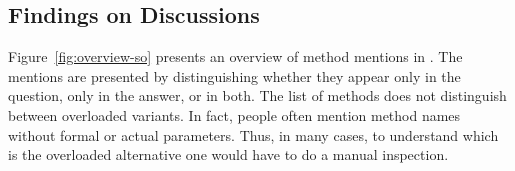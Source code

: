 




\subsection{Findings on \stackoverflow Discussions}

Figure~\ref{fig:overview-so} presents an overview of \smu{} method mentions in \stackoverflow{}. The mentions are presented by distinguishing whether they appear only in the question, only in the answer, or in both.
The list of methods does not distinguish between overloaded variants. In fact, people often mention method names without formal or actual parameters. Thus, in many cases, to understand which is the overloaded alternative one would have to do a manual inspection. 

